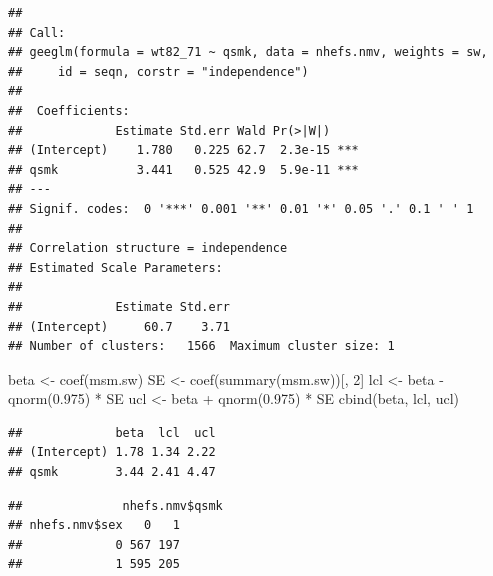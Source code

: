 \documentclass[
  10pt,
]{book}
\newenvironment{Shaded}{\begin{snugshade}}{\end{snugshade}}
\newcommand{\CommentTok}[1]{\textcolor[rgb]{0.56,0.35,0.01}{\textit{#1}}}
\newcommand{\DecValTok}[1]{\textcolor[rgb]{0.00,0.00,0.81}{#1}}
\newcommand{\FloatTok}[1]{\textcolor[rgb]{0.00,0.00,0.81}{#1}}
\newcommand{\FunctionTok}[1]{\textcolor[rgb]{0.00,0.00,0.00}{#1}}
\newcommand{\NormalTok}[1]{#1}
\newcommand{\OtherTok}[1]{\textcolor[rgb]{0.56,0.35,0.01}{#1}}
\newcommand{\SpecialCharTok}[1]{\textcolor[rgb]{0.00,0.00,0.00}{#1}}
\begin{document}
\begin{verbatim}
## 
## Call:
## geeglm(formula = wt82_71 ~ qsmk, data = nhefs.nmv, weights = sw, 
##     id = seqn, corstr = "independence")
## 
##  Coefficients:
##             Estimate Std.err Wald Pr(>|W|)    
## (Intercept)    1.780   0.225 62.7  2.3e-15 ***
## qsmk           3.441   0.525 42.9  5.9e-11 ***
## ---
## Signif. codes:  0 '***' 0.001 '**' 0.01 '*' 0.05 '.' 0.1 ' ' 1
## 
## Correlation structure = independence 
## Estimated Scale Parameters:
## 
##             Estimate Std.err
## (Intercept)     60.7    3.71
## Number of clusters:   1566  Maximum cluster size: 1
\end{verbatim}

\begin{Shaded}
\begin{Highlighting}[]
\NormalTok{beta }\OtherTok{\textless{}{-}} \FunctionTok{coef}\NormalTok{(msm.sw)}
\NormalTok{SE }\OtherTok{\textless{}{-}} \FunctionTok{coef}\NormalTok{(}\FunctionTok{summary}\NormalTok{(msm.sw))[, }\DecValTok{2}\NormalTok{]}
\NormalTok{lcl }\OtherTok{\textless{}{-}}\NormalTok{ beta }\SpecialCharTok{{-}} \FunctionTok{qnorm}\NormalTok{(}\FloatTok{0.975}\NormalTok{) }\SpecialCharTok{*}\NormalTok{ SE}
\NormalTok{ucl }\OtherTok{\textless{}{-}}\NormalTok{ beta }\SpecialCharTok{+} \FunctionTok{qnorm}\NormalTok{(}\FloatTok{0.975}\NormalTok{) }\SpecialCharTok{*}\NormalTok{ SE}
\FunctionTok{cbind}\NormalTok{(beta, lcl, ucl)}
\end{Highlighting}
\end{Shaded}

\begin{verbatim}
##             beta  lcl  ucl
## (Intercept) 1.78 1.34 2.22
## qsmk        3.44 2.41 4.47
\end{verbatim}

\begin{Shaded}
\end{Shaded}

\begin{verbatim}
##              nhefs.nmv$qsmk
## nhefs.nmv$sex   0   1
##             0 567 197
##             1 595 205
\end{verbatim}
\end{document}
